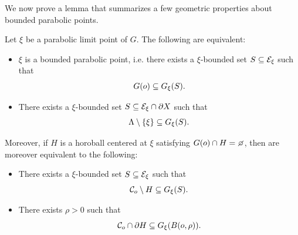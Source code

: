 
We now prove a lemma that summarizes a few geometric properties about bounded parabolic points.

\begin{lemma}
\label{lemmaboundedparabolic}
Let $\xi$ be a parabolic limit point of $G$. The following are equivalent:
\begin{itemize}
\item[(A)] $\xi$ is a bounded parabolic point, i.e. there exists a $\xi$-bounded set $S\subseteq\mathcal E_\xi$ such that
\begin{equation}
\label{LbpA}
G(o)\subseteq G_\xi(S).
\end{equation}
\item[(B)] There exists a $\xi$-bounded set $S\subseteq\mathcal E_\xi\cap\partial X$ such that
\begin{equation}
\label{LbpB}
\Lambda\setminus\{\xi\}\subseteq G_\xi(S).
\end{equation}
\end{itemize}
Moreover, if $H$ is a horoball centered at $\xi$ satisfying $G(\zero)\cap H = \emptyset$, then  are moreover equivalent to the following:
\begin{itemize}
\item[(C)] There exists a $\xi$-bounded set $S\subseteq\mathcal E_\xi$ such that
\begin{equation}
\label{LbpC}
\mathcal C_o \setminus H \subseteq G_\xi(S).
\end{equation}
\item[(D)] There exists $\rho > 0$ such that
\begin{equation}
\label{LbpD}
\mathcal C_o\cap\partial H \subseteq G_\xi(B(o,\rho)).
\end{equation}
\end{itemize}
\end{lemma}

